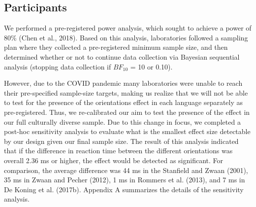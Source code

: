 \documentclass[
  man,floatsintext]{apa7}
\begin{document}
\hypertarget{participants}{%
\subsection{Participants}\label{participants}}

We performed a pre-registered power analysis, which sought to achieve a
power of 80\% (Chen et al., 2018). Based on this analysis, laboratories followed
a sampling plan where they collected a pre-registered minimum sample
size, and then determined whether or not to continue data collection via
Bayesian sequential analysis (stopping data collection if \(BF_{10}\) = 10
or 0.10).

However, due to the COVID pandemic many laboratories were unable to
reach their pre-specified sample-size targets, making us realize that we
will not be able to test for the presence of the orientations effect in
each language separately as pre-registered. Thus, we re-calibrated our
aim to test the presence of the effect in our full culturally diverse
sample. Due to this change in focus, we completed a post-hoc sensitivity
analysis to evaluate what is the smallest effect size detectable by our
design given our final sample size. The result of this analysis
indicated that if the difference in reaction time between the different
orientations was overall 2.36 ms or higher, the effect would be detected
as significant. For comparison, the average difference was 44 ms in the
Stanfield and Zwaan (2001), 35 ms in Zwaan and Pecher (2012), 1
ms in Rommers et al. (2013), and 7 ms in
De Koning et al. (2017b). Appendix A summarizes the details of the
sensitivity analysis.
\end{document}
